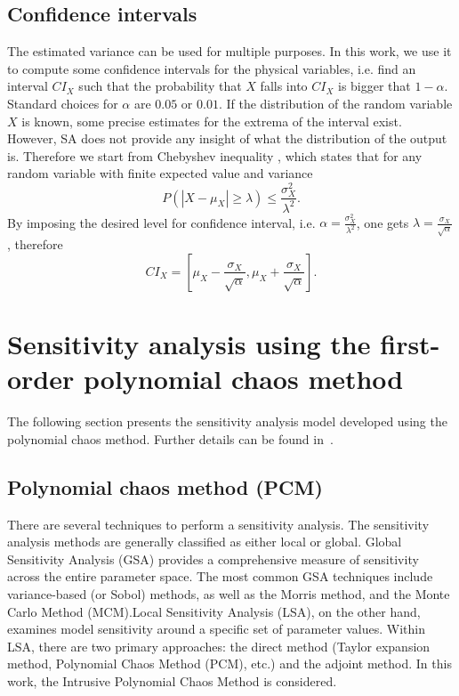 \section{Confidence intervals}
The estimated variance can be used for multiple purposes. In this work, we use it to compute some confidence intervals for the physical variables, i.e. find an interval $CI_X$ such that the probability that $X$ falls into $CI_X$ is bigger that $1-\alpha$. Standard choices for $\alpha$ are $0.05$ or $0.01$. If the distribution of the random variable $X$ is known, some precise estimates for the extrema of the interval exist. However, SA does not provide any insight of what the distribution of the output is. Therefore we start from Chebyshev inequality \cite{jacod2012probability}, which states that for any random variable with finite expected value and variance
\[
P(|X-\mu_X| \geq \lambda) \leq \frac{\sigma^2_X}{\lambda^2}.
\]
By imposing the desired level for confidence interval, i.e. $\alpha = \frac{\sigma^2_X}{\lambda^2}$, one gets $\lambda = \frac{\sigma_X}{\sqrt{\alpha}}$, therefore
\begin{equation}
CI_X = \left[\mu_X - \frac{\sigma_X}{\sqrt{\alpha}}, \mu_X + \frac{\sigma_X}{\sqrt{\alpha}}\right].
\label{CI}
\end{equation}

\chapter{Sensitivity analysis using the first-order polynomial chaos method}
\label{sec_PCM}

The following section presents the sensitivity analysis model developed using the polynomial chaos method. Further details can be found in~\cite{nouaime2024stability,nouaime2025sensitivity,nouaime5183992sensitivity,nouaime2024sensitivity}.

\section{Polynomial chaos method (PCM)}
There are several techniques to perform a sensitivity analysis. 
The sensitivity analysis methods are generally classified as either local or global. Global Sensitivity Analysis (GSA) provides a comprehensive measure of sensitivity across the entire parameter space. The most common GSA techniques include variance-based (or Sobol) methods, as well as the Morris method, and the Monte Carlo Method (MCM).Local Sensitivity Analysis (LSA), on the other hand, examines model sensitivity around a specific set of parameter values. Within LSA, there are two primary approaches: the direct method (Taylor expansion method, Polynomial Chaos Method (PCM), etc.) and the adjoint method. In this work, the Intrusive Polynomial Chaos Method is considered.

